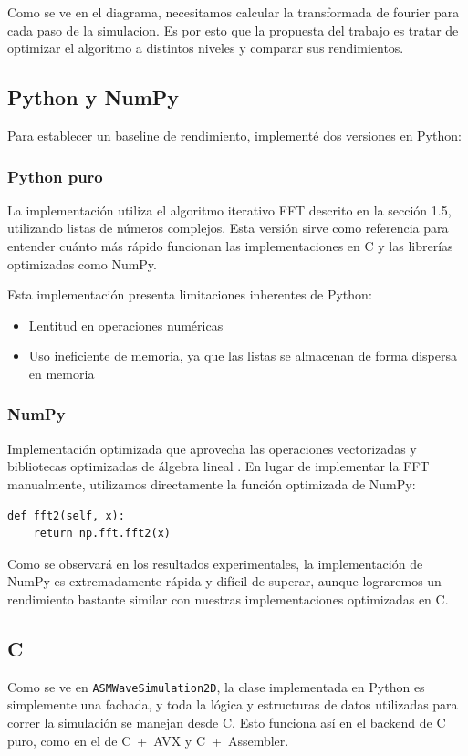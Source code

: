 \documentclass[a4paper]{article}
\begin{document}
Como se ve en el diagrama, necesitamos calcular la transformada de fourier para cada paso de la simulacion. Es por esto que la propuesta del trabajo es tratar de optimizar el algoritmo a distintos niveles y comparar sus rendimientos.

\subsection{Python y NumPy}

Para establecer un baseline de rendimiento, implementé dos versiones en Python:

\subsubsection{Python puro} La implementación utiliza el algoritmo iterativo FFT descrito en la sección 1.5, utilizando listas de números complejos.
Esta versión sirve como referencia para entender cuánto más rápido funcionan las implementaciones en C y las librerías optimizadas como NumPy.

Esta implementación presenta limitaciones inherentes de Python:
\begin{itemize}
    \item Lentitud en operaciones numéricas
    \item Uso ineficiente de memoria, ya que las listas se almacenan de forma dispersa en memoria
\end{itemize}

\subsubsection{NumPy} Implementación optimizada que aprovecha las operaciones vectorizadas y bibliotecas optimizadas de álgebra lineal \cite{numpy2020array}. En lugar
de implementar la FFT manualmente, utilizamos directamente la función optimizada de NumPy:

\begin{verbatim}
def fft2(self, x):
    return np.fft.fft2(x)
\end{verbatim}

Como se observará en los resultados experimentales, la implementación de NumPy es extremadamente rápida y difícil de superar, aunque lograremos
un rendimiento bastante similar con nuestras implementaciones optimizadas en C.

\subsection{C}
Como se ve en \texttt{ASMWaveSimulation2D}, la clase implementada en Python es simplemente una fachada, y toda la lógica y estructuras de datos utilizadas para correr la simulación se manejan desde C. Esto funciona así en el backend de C puro, como en el de C~+~AVX y C~+~Assembler.
\end{document}
